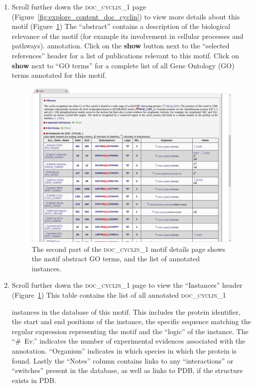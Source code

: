 \documentclass[12pt]{article}
\newcommand\button[1]{%
	\textbf{#1}%
}
\newcommand\motif[1]{%
    \textsc{\lowercase{#1}}%
}
\begin{document}
\begin{enumerate}
\item Scroll further down the \motif{DOC\_CYCLIN\_1} page
	(Figure~\ref{fig:explore_content_doc_cyclin}) to view
	more details about this motif
    (Figure~\ref{fig:explore_content_doc_cyclin_1_abstract_instances})
    The ``abstract'' contains a description of the biological relevance of the
    motif (for example its involvement in cellular processes and pathways).
	annotation. Click on the \button{show} button next to the ``selected
	references'' header for a list of publications relevant to this motif.
	Click on \button{show} next to ``GO terms'' for a complete list of all
	Gene Ontology (GO) terms annotated for this motif.

\begin{figure}[h!]
	\centering
	\includegraphics[width=\textwidth]{Figures/explore_content/doc_cyclin_1_abstract_instances.png}
	\caption{
		The second part of the \motif{DOC\_CYCLIN\_1} motif details page
		shows the motif abstract GO terms, and the list of annotated
		instances.
	}
	\label{fig:explore_content_doc_cyclin_1_abstract_instances}
\end{figure}

\item Scroll further down the \motif{DOC\_CYCLIN\_1} page to view
	the ``Instances'' header
	(Figure~\ref{fig:explore_content_doc_cyclin_1_abstract_instances})
	This table contains the list of all annotated \motif{DOC\_CYCLIN\_1}
	instances in the database of this motif. This includes the protein
	identifier, the start and end positions of the instance, the specific
	sequence matching the regular expression representing the motif and
	the ``logic'' of the instance.
	The ``\#~Ev.'' indicates the number of experimental evidences
	associated with the annotation. ``Organism'' indicates in which
	species in which the protein is found. Lastly the ``Notes'' column
	contains links to any ``interactions'' or ``switches'' present in the
	database, as well as links to PDB, if the structure exists in PDB.


\end{enumerate}
\end{document}
